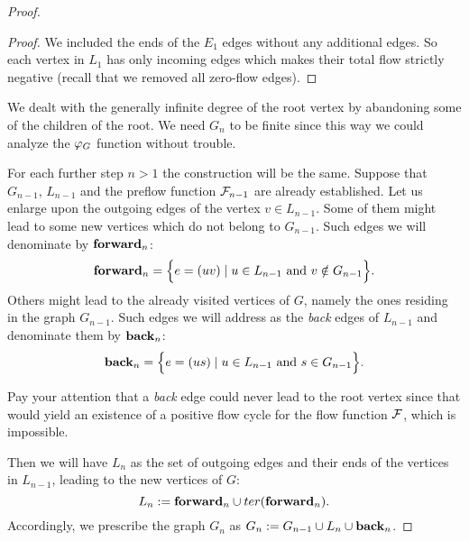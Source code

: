 \documentclass[12pt]{article}
\begin{document}
\begin{proof}
\begin{proof}
        We included the ends of the $E_1$ edges without any additional edges.
        So each vertex in $L_1$ has only incoming edges which makes their total flow strictly negative (recall that we removed all zero-flow edges).
      \end{proof}
      \begin{note}
        We dealt with the generally infinite degree of the root vertex by abandoning some of the children of the root.
        We need $G_n$ to be finite since this way we could analyze the $\varphi_{G}$ function without trouble.
      \end{note}
      For each further step $n > 1$ the construction will be the same.
      Suppose that $G_{n-1}$, $L_{n-1}$ and the preflow function $\mathcal{F}_{n-1}$ are already established.
      Let us enlarge upon the outgoing edges of the vertex $v \in L_{n-1}$.
      Some of them might lead to some new vertices which do not belong to $G_{n-1}$.
      Such edges we will denominate by $\mathbf{forward}_n$:
      \[
        \mathbf{forward}_n = \Big\{ e = (uv) \mid u \in L_{n-1} \text{ and } v \notin G_{n-1}\Big\}.
      \]
      Others might lead to the already visited vertices of $G$, namely the ones residing in the graph $G_{n-1}$.
      Such edges we will address as the \emph{back} edges of $L_{n-1}$ and denominate them by $\mathbf{back}_n$:
      \[
        \mathbf{back}_n = \Big\{e = (us) \mid u \in L_{n-1} \text{ and } s \in G_{n-1}\Big\}.
      \]
      \begin{remark}
        Pay your attention that a \emph{back} edge could never lead to the root vertex since that
          would yield an existence of a positive flow cycle for the flow function $\mathcal{F}$,
          which is impossible.
      \end{remark}
      Then we will have $L_n$ as the set of outgoing edges and their ends of the vertices in $L_{n-1}$, leading to the new vertices of $G$:
      \[
        L_n := \mathbf{forward}_n \cup ter(\mathbf{forward}_n).
      \]
      Accordingly, we prescribe the graph $G_n$ as $G_n := G_{n-1} \cup L_n \cup \mathbf{back}_n$.


\end{proof}
\end{document}
